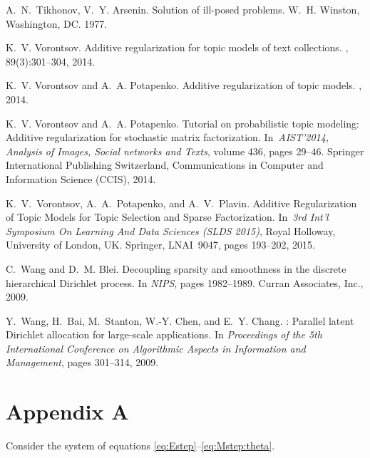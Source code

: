 \documentclass{sig-alternate-2013}
\begin{document}
\begin{thebibliography}{10}
A.~N.~Tikhonov, V.~Y. Arsenin.
\newblock Solution of ill-posed problems.
\newblock W.~H. Winston, Washington, DC. 1977.

K.~V. Vorontsov.
\newblock Additive regularization for topic models of text collections.
, 89(3):301--304, 2014.

K.~V. Vorontsov and A.~A. Potapenko.
\newblock Additive regularization of topic models.
, 2014.

K.~V. Vorontsov and A.~A. Potapenko.
\newblock Tutorial on probabilistic topic modeling: Additive regularization for stochastic matrix factorization.
\newblock In~{\em AIST'2014, Analysis of Images, Social networks and Texts},
  volume 436, pages 29--46. Springer International Publishing Switzerland,
  Communications in Computer and Information Science (CCIS), 2014.

K.~V.~Vorontsov, A.~A.~Potapenko, and A.~V.~Plavin.
\newblock Additive Regularization of Topic Models for Topic Selection and Sparse Factorization.
\newblock In~{\em 3rd Int'l Symposium On Learning And Data Sciences (SLDS 2015)},
    Royal Holloway, University of London, UK.
    Springer, LNAI~9047, pages 193--202, 2015.

C.~Wang and D.~M. Blei.
\newblock Decoupling sparsity and smoothness in the discrete hierarchical Dirichlet process.
\newblock In {\em NIPS}, pages 1982--1989. Curran Associates, Inc., 2009.

Y.~Wang, H.~Bai, M.~Stanton, W.-Y. Chen, and E.~Y. Chang.
: Parallel latent {D}irichlet allocation for large-scale applications.
\newblock In {\em Proceedings of the 5th International Conference on
  Algorithmic Aspects in Information and Management}, pages 301--314, 2009.

\end{thebibliography}

\section*{Appendix A}

Consider the system of equations \eqref{eq:Estep}--\eqref{eq:Mstep:theta}.
\end{document}
